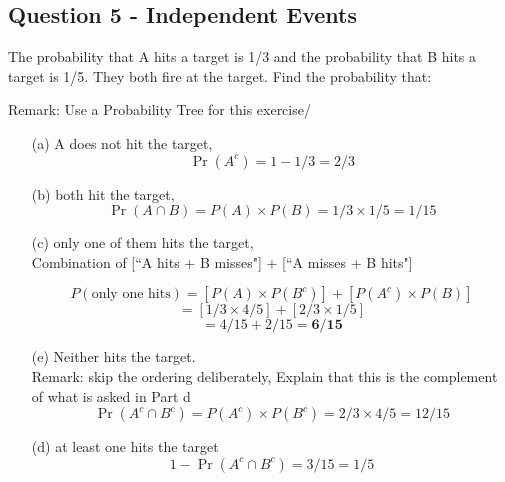 \documentclass[]{report}
\begin{document}
\subsection*{Question 5 - Independent Events}
The probability that A hits a target is 1/3 and the probability that B hits a target is 1/5.  They both fire at the target. Find the probability that:

Remark: Use a Probability Tree for this exercise/
\begin{itemize}
\item[(a)] A does not hit the target, 
\[\Pr(A^c) = 1 - 1/3 = 2/3 \]
\item[(b)] both hit the target, 
\[\Pr(A \cap B)  = P(A) \times P(B) = 1/3 \times 1/5 = 1/15\] 
\item[(c)] only one of them hits the target,\\

Combination of [``A hits + B misses"] + [``A misses + B hits"]

\[P(\mbox{only one hits}) =  [P(A)\times P(B^c) ]+ [P(A^c)\times P(B) ]  \]
\[= [1/3 \times 4/5] + [2/3 \times 1/5 ]\]
\[= 4/15 + 2/15 = \boldsymbol{6/15}\]

\item[(e)] Neither hits the target.
\\ Remark: skip the ordering deliberately, Explain that this is the complement of what is asked in Part d
\[\Pr(A^c \cap B^c)  = P(A^c) \times P(B^c) = 2/3 \times 4/5 = 12/15\] 
\item[(d)] at least one hits the target
\[1- \Pr(A^c \cap B^c) = 3/15 =1/5\]
\end{itemize}
\end{document}
